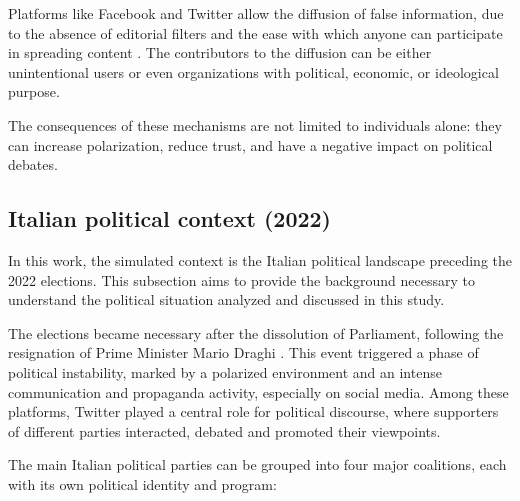 \medskip
Platforms like Facebook and Twitter allow the diffusion of false information, due to the absence of editorial filters and the ease with which anyone can participate in spreading content \cite{hilary2021social}.
The contributors to the diffusion can be either unintentional users or even organizations with political, economic, or ideological purpose.

The consequences of these mechanisms are not limited to individuals alone: they can increase polarization, reduce trust, and have a negative impact on political debates.



\subsection{Italian political context (2022)}
In this work, the simulated context is the Italian political landscape preceding the 2022 elections.
This subsection aims to provide the background necessary to understand the political situation analyzed and discussed in this study.

\medskip
The elections became necessary after the dissolution of Parliament, following the resignation of Prime Minister Mario Draghi \cite{pierri2024drivers}.
This event triggered a phase of political instability, marked by a polarized environment and an intense communication and propaganda activity, especially on social media.
Among these platforms, Twitter played a central role for political discourse, where supporters of different parties interacted, debated and promoted their viewpoints.

\medskip
The main Italian political parties can be grouped into four major coalitions, each with its own political identity and program:

